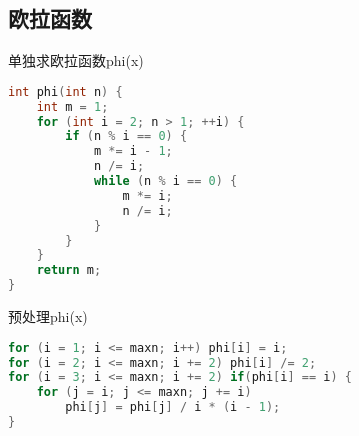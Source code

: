 \subsection{欧拉函数}
单独求欧拉函数phi(x)
    \begin{lstlisting}[language=c++]
int phi(int n) {
	int m = 1;
	for (int i = 2; n > 1; ++i) {
		if (n % i == 0) {
			m *= i - 1;
			n /= i;
			while (n % i == 0) {
				m *= i;
				n /= i;
			}
		}
	}
	return m;
}
    \end{lstlisting}
预处理phi(x)
    \begin{lstlisting}[language=c++]
for (i = 1; i <= maxn; i++) phi[i] = i;
for (i = 2; i <= maxn; i += 2) phi[i] /= 2;
for (i = 3; i <= maxn; i += 2) if(phi[i] == i) {
    for (j = i; j <= maxn; j += i)
        phi[j] = phi[j] / i * (i - 1);
}
    \end{lstlisting}
